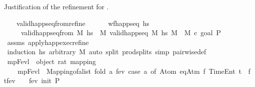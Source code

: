 \begin{isabellebody}
\begin{isamarkuptext}%
Justification of the refinement for .%
\end{isamarkuptext}\isamarkuptrue%
\ \ \isamarkupfalse%
\ valid{\isacharunderscore}{\kern0pt}happ{\isacharunderscore}{\kern0pt}seq{\isacharunderscore}{\kern0pt}from{\isacharunderscore}{\kern0pt}refine{\isacharcolon}{\kern0pt}\ \isanewline
\ \ \ \ \ {\isachardoublequoteopen}wf{\isacharunderscore}{\kern0pt}happ{\isacharunderscore}{\kern0pt}seq\ hs{\isachardoublequoteclose}\isanewline
\ \ \ \ \ {\isachardoublequoteopen}valid{\isacharunderscore}{\kern0pt}happ{\isacharunderscore}{\kern0pt}seq{\isacharunderscore}{\kern0pt}from\ M\ hs\ {\isasymlongleftrightarrow}\ {\isacharparenleft}{\kern0pt}{\isasymexists}M{\isacharprime}{\kern0pt}{\isachardot}{\kern0pt}\ valid{\isacharunderscore}{\kern0pt}happ{\isacharunderscore}{\kern0pt}seq\ M\ hs\ M{\isacharprime}{\kern0pt}\ {\isasymand}\ M{\isacharprime}{\kern0pt}\ \isactrlsup c{\isasymTTurnstile}\isactrlsub {\isacharequal}{\kern0pt}\ {\isacharparenleft}{\kern0pt}goal\ P{\isacharparenright}{\kern0pt}{\isacharparenright}{\kern0pt}{\isachardoublequoteclose}\isanewline
%
\isadelimproof
\ \ \ \ %
\endisadelimproof
%
\isatagproof
{}\isamarkupfalse%
\ assms\ apply{\isacharunderscore}{\kern0pt}happ{\isacharunderscore}{\kern0pt}exec{\isacharunderscore}{\kern0pt}refine\isanewline
\ \ \ \ \isamarkupfalse%
\ {\isacharparenleft}{\kern0pt}induction\ hs\ arbitrary{\isacharcolon}{\kern0pt}\ M{\isacharparenright}{\kern0pt}\ {\isacharparenleft}{\kern0pt}auto\ split{\isacharcolon}{\kern0pt}\ prod{\isachardot}{\kern0pt}splits\ simp{\isacharcolon}{\kern0pt}\ pairwise{\isacharunderscore}{\kern0pt}def{\isacharparenright}{\kern0pt}%
\endisatagproof
{\isafoldproof}%
%
\isadelimproof
\isanewline
%
\endisadelimproof
\isanewline
\ \ \isamarkupfalse%
\ mp{\isacharunderscore}{\kern0pt}Fevl\ {\isacharcolon}{\kern0pt}{\isacharcolon}{\kern0pt}\ {\isachardoublequoteopen}{\isacharparenleft}{\kern0pt}object{\isacharcomma}{\kern0pt}\ rat{\isacharparenright}{\kern0pt}\ mapping{\isachardoublequoteclose}\ \isanewline
\ \ \ \ {\isachardoublequoteopen}mp{\isacharunderscore}{\kern0pt}Fevl\ {\isacharequal}{\kern0pt}\ Mapping{\isachardot}{\kern0pt}of{\isacharunderscore}{\kern0pt}alist\ {\isacharparenleft}{\kern0pt}fold\ {\isacharparenleft}{\kern0pt}{\isasymlambda}a\ fev{\isachardot}{\kern0pt}\ case\ a\ of\ Atom\ {\isacharparenleft}{\kern0pt}eqAtm\ f\ {\isacharparenleft}{\kern0pt}TimeEnt\ t{\isacharparenright}{\kern0pt}{\isacharparenright}{\kern0pt}\ {\isasymRightarrow}\ {\isacharparenleft}{\kern0pt}f{\isacharcomma}{\kern0pt}t{\isacharparenright}{\kern0pt}{\isacharhash}{\kern0pt}fev\ {\isacharbar}{\kern0pt}\ {\isacharunderscore}{\kern0pt}\ {\isasymRightarrow}\ fev{\isacharparenright}{\kern0pt}\ {\isacharparenleft}{\kern0pt}init\ P{\isacharparenright}{\kern0pt}\ {\isacharbrackleft}{\kern0pt}{\isacharbrackright}{\kern0pt}{\isacharparenright}{\kern0pt}{\isachardoublequoteclose}\isanewline

\end{isabellebody}
